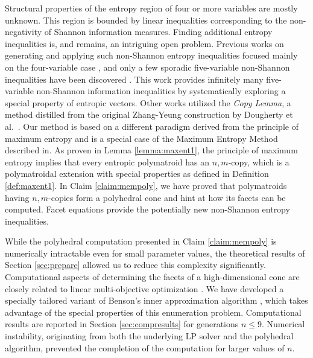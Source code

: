 \documentclass[reqno]{amsart}
\theoremstyle{definition}
\begin{document}
Structural properties of the entropy region of four or more variables are
mostly unknown. This region is bounded by linear inequalities corresponding
to the non-negativity of Shannon information measures. Finding additional
entropy inequalities is, and remains, an intriguing open problem. Previous
works on generating and applying such non-Shannon entropy inequalities
focused mainly on the four-variable case
\cite{Beimel.Orlov,csirmaz.book,DFZ11,studeny}, and only a few sporadic
five-variable non-Shannon inequalities have been discovered \cite{MMRV}.
This work provides infinitely many five-variable non-Shannon information
inequalities by systematically exploring a special property of entropic
vectors. Other works utilized the \emph{Copy Lemma}, a method distilled from
the original Zhang-Yeung construction by Dougherty et al.~\cite{DFZ11}. Our
method is based on a different paradigm derived from the principle of
maximum entropy and is a special case of the Maximum Entropy Method
described in\cite{exploring}. As proven in Lemma \ref{lemma:maxent1}, the
principle of maximum entropy implies that every entropic polymatroid has an
$n,m$-copy, which is a polymatroidal extension with special properties as
defined in Definition \ref{def:maxent1}. In Claim \ref{claim:mempoly}, we
have proved that polymatroids having $n,m$-copies form a polyhedral cone and
hint at how its facets can be computed. Facet equations provide the
potentially new non-Shannon entropy inequalities.

\smallskip

While the polyhedral computation presented in Claim \ref{claim:mempoly} is
numerically intractable even for small parameter values, the theoretical
results of Section \ref{sec:prepare} allowed us to reduce this complexity
significantly. Computational aspects of determining the facets of a
high-dimensional cone are closely related to linear multi-objective
optimization \cite{inner}. We have developed a specially tailored variant of
Benson's inner approximation algorithm \cite{inner,bensolve}, which takes
advantage of the special properties of this enumeration problem.
Computational results are reported in Section \ref{sec:compresults} for
generations $n\le 9$. Numerical instability, originating from both the
underlying LP solver and the polyhedral algorithm, prevented the completion
of the computation for larger values of $n$.

\smallskip
\end{document}
